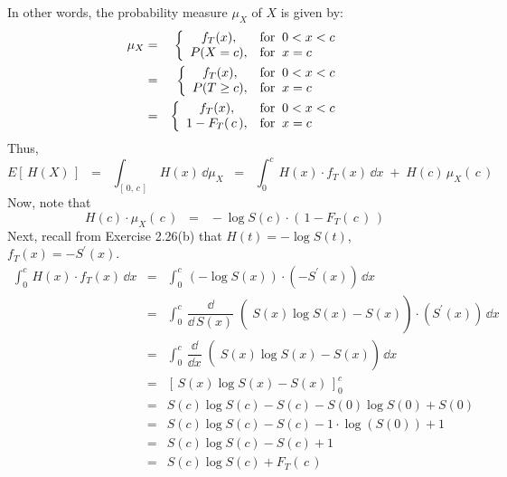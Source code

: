 In other words, the probability measure $\mu_{X}$ of $X$ is given by:
\begin{eqnarray*}
\mu_{X} 
&=&
\left\{\begin{array}{cl}
f_{T}(x), & \textnormal{for}\;\; 0 < x < c \\
P(X = c), & \textnormal{for}\;\; x = c \\
\end{array}\right.
\\
&=&
\left\{\begin{array}{cl}
f_{T}(x),    & \textnormal{for}\;\; 0< x < c \\
P(T \geq c), & \textnormal{for}\;\; x = c \\
\end{array}\right.
\\
&=&
\left\{\begin{array}{cl}
f_{T}(x),         & \textnormal{for}\;\; 0< x < c \\
1 - F_{T}(\,c\,), & \textnormal{for}\;\; x = c \\
\end{array}\right.
\\
\end{eqnarray*}
Thus,
\begin{equation*}
E\left[\,H(X)\,\right]
\;\;=\;\; \int_{[\,0,\,c\,]}\,H(x)\,\dd\mu_{X}
\;\;=\;\; \int_{0}^{c}\,H(x)\cdot f_{T}(x)\,\dd x \;+\; H(c)\,\mu_{X}(\,c\,)
\end{equation*}
Now, note that
\begin{equation*}
H(c)\cdot \mu_{X}(\,c\,)
\;\; = \;\;
-\log S(c) \cdot \left(\,1 - F_{T}(\,c\,)\,\right)
\end{equation*}
Next, recall from Exercise 2.26(b) that $H(t) = - \log S(t)$, $f_{T}(x) = - S^{\prime}(x)$.
\begin{eqnarray*}
    \int_{0}^{c}\,H(x)\cdot f_{T}(x)\,\dd x
&=& \int_{0}^{c}\,\left(- \log S(x)\right) \cdot \left(-S^{\prime}(x)\right)\,\dd x \\
&=& \int_{0}^{c}\,\left.\left.\dfrac{\dd}{\dd\,S(x)}\right(S(x)\log S(x)-S(x)\right) \cdot \left(S^{\prime}(x)\right)\,\dd x \\
&=& \int_{0}^{c}\,\left.\left.\dfrac{\dd}{\dd x}\right(S(x)\log S(x)-S(x)\right)\,\dd x \\
&=& \left[\,S(x)\log S(x)-S(x)\,\right]_{0}^{c} \\
&=& S(c)\log S(c) - S(c) - S(0)\log S(0) + S(0) \\
&=& S(c)\log S(c) - S(c) - 1\cdot\log(S(0)) + 1 \\
&=& S(c)\log S(c) - S(c) + 1 \\
&=& S(c)\log S(c) + F_{T}(\,c\,) \\
\end{eqnarray*}
